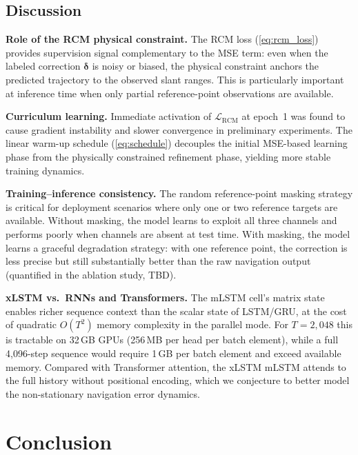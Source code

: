 \documentclass[conference]{IEEEtran}
\newcommand{\vdelta}{\bm{\delta}}
\begin{document}
\subsection{Discussion}

\textbf{Role of the RCM physical constraint.}
The RCM loss (\ref{eq:rcm_loss}) provides supervision signal
complementary to the MSE term:
even when the labeled correction $\vdelta$ is noisy or biased,
the physical constraint anchors the predicted trajectory to
the observed slant ranges.
This is particularly important at inference time when
only partial reference-point observations are available.

\textbf{Curriculum learning.}
Immediate activation of $\mathcal{L}_\text{RCM}$ at epoch~1 was found to
cause gradient instability and slower convergence in preliminary experiments.
The linear warm-up schedule (\ref{eq:schedule}) decouples
the initial MSE-based learning phase from
the physically constrained refinement phase,
yielding more stable training dynamics.

\textbf{Training–inference consistency.}
The random reference-point masking strategy is critical for
deployment scenarios where only one or two reference targets are available.
Without masking, the model learns to exploit all three channels and
performs poorly when channels are absent at test time.
With masking, the model learns a graceful degradation strategy:
with one reference point, the correction is less precise but still
substantially better than the raw navigation output
(quantified in the ablation study, TBD).

\textbf{xLSTM vs.\ RNNs and Transformers.}
The mLSTM cell's matrix state enables richer sequence context than
the scalar state of LSTM/GRU, at the cost of quadratic
$O(T^2)$ memory complexity in the parallel mode.
For $T{=}2{,}048$ this is tractable on 32\,GB GPUs (256\,MB per
head per batch element), while a full 4{,}096-step sequence would
require 1\,GB per batch element and exceed available memory.
Compared with Transformer attention, the xLSTM mLSTM attends to the
full history without positional encoding, which we conjecture to
better model the non-stationary navigation error dynamics.

\section{Conclusion}
\label{sec:conclusion}
\end{document}
